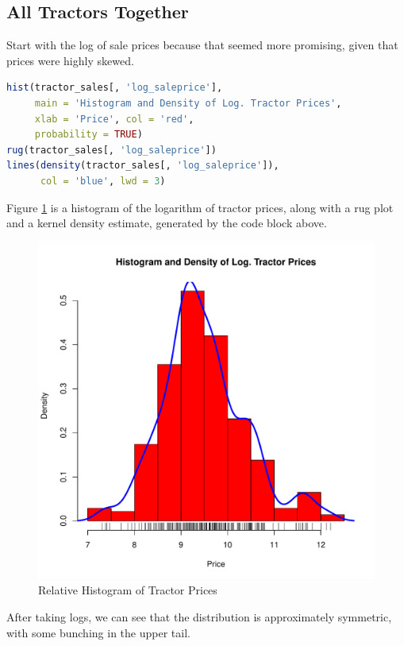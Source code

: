 \subsection{All Tractors Together}

Start with the log of sale prices because that
seemed more promising, given that prices were highly skewed.

\begin{lstlisting}[language=R]
hist(tractor_sales[, 'log_saleprice'],
     main = 'Histogram and Density of Log. Tractor Prices',
     xlab = 'Price', col = 'red',
     probability = TRUE)
rug(tractor_sales[, 'log_saleprice'])
lines(density(tractor_sales[, 'log_saleprice']),
      col = 'blue', lwd = 3)
\end{lstlisting}


Figure \ref{fig:hist_dens_log_price} is
a histogram of the logarithm of tractor prices,
along with a rug plot and a kernel density estimate,
generated by the code block above.
%
\begin{figure}[h!]
  \centering
  \includegraphics[scale = 0.5, keepaspectratio=true]{../Figures/hist_dens_log_price}
  \caption{Relative Histogram of Tractor Prices} \label{fig:hist_dens_log_price}
\end{figure}
%
After taking logs, we can see that the distribution is
approximately symmetric, with some bunching in the
upper tail.

